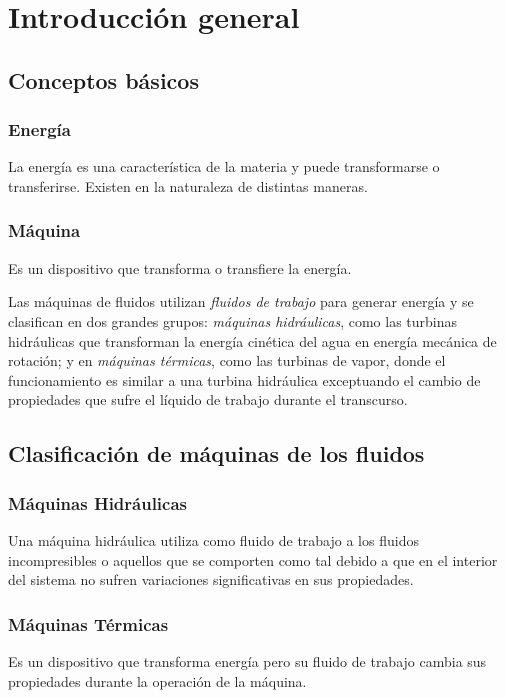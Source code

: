 \documentclass[11pt,a4paper]{article}
\begin{document}
	\pagestyle{fancy}
	\section{Introducción general}
	
	\subsection{Conceptos básicos}
	
	\subsubsection{Energía} La energía es una característica de la materia y puede transformarse o transferirse. Existen en la naturaleza de distintas maneras.
	
	\subsubsection{Máquina} Es un dispositivo que transforma o transfiere la energía.
	
	Las máquinas de fluidos utilizan \textsl{fluidos de trabajo} para generar energía y se clasifican en dos grandes grupos: \textsl{máquinas hidráulicas}, como las turbinas hidráulicas que transforman la energía cinética del agua en energía mecánica de rotación; y en \textsl{máquinas térmicas}, como las turbinas de vapor, donde el funcionamiento es similar a una turbina hidráulica exceptuando el cambio de propiedades que sufre el líquido de trabajo durante el transcurso.
	
	\subsection{Clasificación de máquinas de los fluidos}
	\lipsum[1]
	\subsubsection{Máquinas Hidráulicas} Una máquina hidráulica utiliza como fluido de trabajo a los fluidos incompresibles o aquellos que se comporten como tal debido a que en el interior del sistema no sufren variaciones significativas en sus propiedades.
	\subsubsection{Máquinas Térmicas} Es un dispositivo que transforma energía pero su fluido de trabajo cambia sus propiedades durante la operación de la máquina.
	
\end{document}

